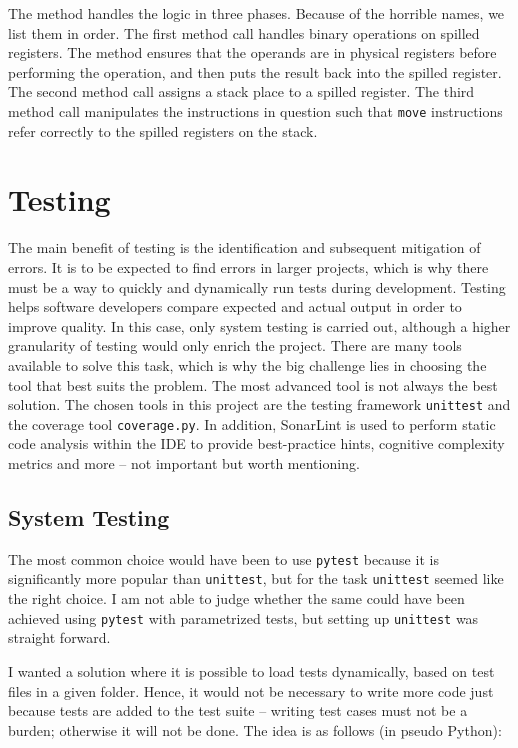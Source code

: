 The method handles the logic in three phases. Because of the horrible names, we list them in order. The first method call handles binary operations on spilled registers. The method ensures that the operands are in physical registers before performing the operation, and then puts the result back into the spilled register. The second method call assigns a stack place to a spilled register. The third method call manipulates the instructions in question such that \texttt{move} instructions refer correctly to the spilled registers on the stack.


\chapter{Testing}
The main benefit of testing is the identification and subsequent mitigation of errors. It is to be expected to find errors in larger projects, which is why there must be a way to quickly and dynamically run tests during development. Testing helps software developers compare expected and actual output in order to improve quality. In this case, only system testing is carried out, although a higher granularity of testing would only enrich the project. There are many tools available to solve this task, which is why the big challenge lies in choosing the tool that best suits the problem. The most advanced tool is not always the best solution. The chosen tools in this project are the testing framework \texttt{unittest} and the coverage tool \texttt{coverage.py}. In addition, SonarLint is used to perform static code analysis within the IDE to provide best-practice hints, cognitive complexity metrics and more -- not important but worth mentioning.

\section{System Testing}
The most common choice would have been to use \texttt{pytest} because it is significantly more popular than \texttt{unittest}, but for the task \texttt{unittest} seemed like the right choice. I am not able to judge whether the same could have been achieved using \texttt{pytest} with parametrized tests, but setting up \texttt{unittest} was straight forward.

I wanted a solution where it is possible to load tests dynamically, based on test files in a given folder. Hence, it would not be necessary to write more code just because tests are added to the test suite -- writing test cases must not be a burden; otherwise it will not be done. The idea is as follows (in pseudo Python):

